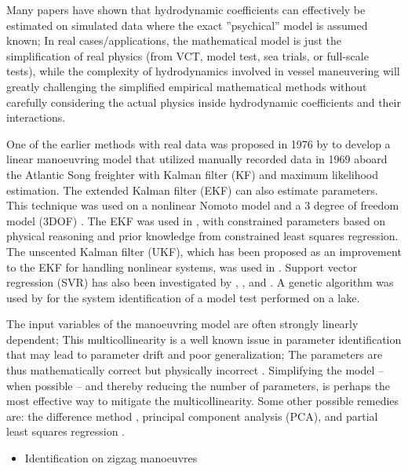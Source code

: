 Many papers have shown that hydrodynamic coefficients can effectively be estimated on simulated data where the exact ''psychical'' model is assumed known; In real cases/applications, the mathematical model is just the simplification of real physics (from VCT, model test, sea trials, or full-scale tests), while the complexity of hydrodynamics involved in vessel maneuvering will greatly challenging the simplified empirical mathematical methods without carefully considering the actual physics inside hydrodynamic coefficients and their interactions.

One of the earlier methods with real data was proposed in 1976 by \citet{astrom_identification_1976} to develop a linear manoeuvring model that utilized manually recorded data in 1969 aboard the Atlantic Song freighter with Kalman filter (KF) and maximum likelihood estimation. 
The extended Kalman filter (EKF) can also estimate parameters. This technique was used on a nonlinear Nomoto model \citep{perera_system_2015} and a 3 degree of freedom model (3DOF) \citep{shi_identification_2009}. The EKF was used in \citet{araki_estimating_2012}, with constrained parameters based on physical reasoning and prior knowledge from constrained least squares regression. The unscented Kalman filter (UKF), which has been proposed as an improvement to the EKF for handling nonlinear systems, was used in \citet{revestido_herrero_two-step_2012}.
Support vector regression (SVR) has also been investigated by \citet{luo_parameter_2016}, \citet{zhu_parameter_2017}, and \citet{wang_parameter_2021}. A genetic algorithm was used by \citet{miller_ship_2021} for the system identification of a model test performed on a lake.

The input variables of the manoeuvring model are often strongly linearly dependent; This multicollinearity is a well known issue in parameter identification that may lead to parameter drift and poor generalization; The parameters are thus mathematically correct but physically incorrect \citep{luo_parameter_2016}. 
Simplifying the model -- when possible -- and thereby reducing the number of parameters, is perhaps the most effective way to mitigate the multicollinearity.
Some other possible remedies are: the difference method \citep{luo_parameter_2016}, principal component analysis (PCA), and partial least squares regression \citep{jian-chuan_parametric_2015}. 

\begin{itemize}
    \item Identification on zigzag manoeuvres
\end{itemize}

